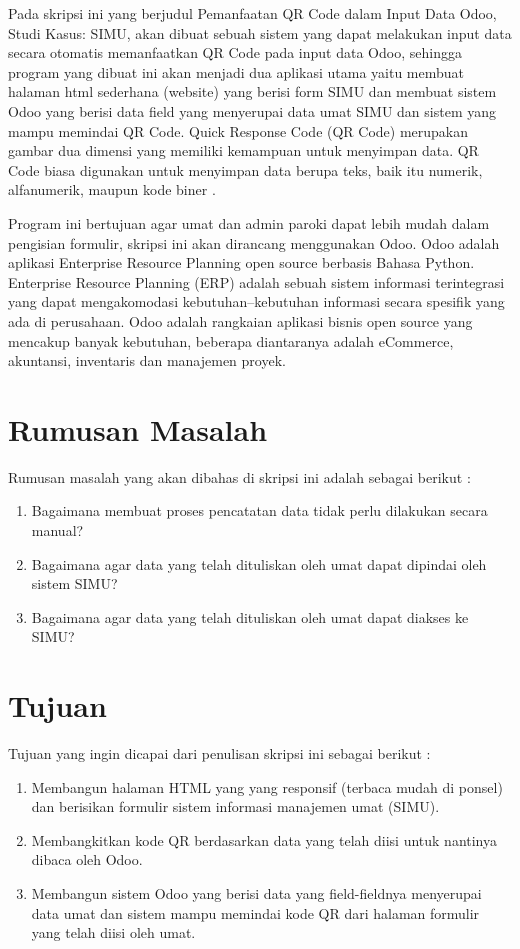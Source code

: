 Pada skripsi ini yang berjudul Pemanfaatan QR Code dalam Input Data Odoo, Studi Kasus: SIMU, akan dibuat sebuah sistem yang dapat melakukan input data secara otomatis memanfaatkan QR Code pada input data Odoo, sehingga program yang dibuat ini akan menjadi dua aplikasi utama yaitu membuat halaman html sederhana (website) yang berisi form SIMU dan membuat sistem Odoo yang berisi data field yang menyerupai data umat SIMU dan sistem yang mampu memindai QR Code. Quick Response Code (QR Code) merupakan gambar dua dimensi yang memiliki kemampuan untuk menyimpan data. QR Code biasa digunakan untuk menyimpan data berupa teks, baik itu numerik, alfanumerik, maupun kode biner \cite{qrcode:13:median}.

Program ini bertujuan agar umat dan admin paroki dapat lebih mudah dalam pengisian formulir, skripsi ini akan dirancang menggunakan Odoo. Odoo adalah aplikasi Enterprise Resource Planning open source berbasis Bahasa Python. Enterprise Resource Planning (ERP) adalah sebuah sistem informasi terintegrasi yang dapat mengakomodasi kebutuhan–kebutuhan informasi secara spesifik yang ada di perusahaan. Odoo adalah rangkaian aplikasi bisnis open source yang mencakup banyak kebutuhan, beberapa diantaranya adalah eCommerce, akuntansi, inventaris dan manajemen proyek.

\section{Rumusan Masalah}
\label{sec:rumusan}
Rumusan masalah yang akan dibahas di skripsi ini adalah sebagai berikut :
\begin{enumerate}
	\item Bagaimana membuat proses pencatatan data tidak perlu dilakukan secara manual?
	\item Bagaimana agar data yang telah dituliskan oleh umat dapat dipindai oleh sistem SIMU?
	\item Bagaimana agar data yang telah dituliskan oleh umat dapat diakses ke SIMU?
\end{enumerate} 


\section{Tujuan}
\label{sec:tujuan}
Tujuan yang ingin dicapai dari penulisan skripsi ini sebagai berikut :
\begin{enumerate}
	\item Membangun halaman HTML yang yang responsif (terbaca mudah di ponsel) dan berisikan formulir sistem informasi manajemen umat (SIMU).
	\item Membangkitkan kode QR berdasarkan data yang telah diisi untuk nantinya dibaca oleh Odoo.
	\item Membangun sistem Odoo yang berisi data yang field-fieldnya menyerupai data umat dan sistem mampu memindai kode QR dari halaman formulir yang telah diisi oleh umat.
\end{enumerate}


